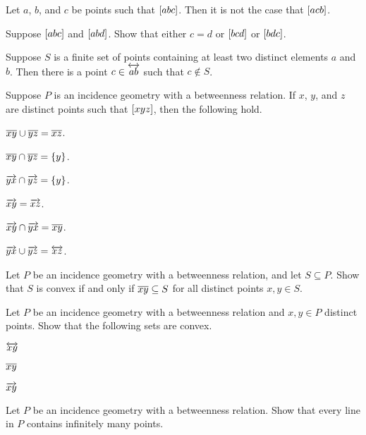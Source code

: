 \Exercises%

\begin{exercise}
Let \(a\), \(b\), and \(c\) be points such that \([ a b c ]\).
Then it is not the case that \([ a c b ]\).
\end{exercise}

\begin{exercise}
Suppose \([ a b c ]\) and \([ a b d ]\).
Show that either \(c = d\) or \([ b c d ]\) or \([ b d c ]\).
\end{exercise}

\begin{exercise}
Suppose \(S\) is a finite set of points containing at least two distinct elements \(a\) and \(b\).
Then there is a point \(c \in \overleftrightarrow{ab}\) such that \(c \notin S\).
\end{exercise}

\begin{exercise}
Suppose \(P\) is an incidence geometry with a betweenness relation.
If \(x\), \(y\), and \(z\) are distinct points such that \([ x y z ]\), then the following hold.
\begin{proplist}
\item \(\overline{xy} \cup \overline{yz} = \overline{xz}\).
\item \(\overline{xy} \cap \overline{yz} = \{y\}\).
\item \(\overrightarrow{yx} \cap \overrightarrow{yz} = \{y\}\).
\item \(\overrightarrow{xy} = \overrightarrow{xz}\).
\item \(\overrightarrow{xy} \cap \overrightarrow{yx} = \overline{xy}\).
\item \(\overrightarrow{yx} \cup \overrightarrow{yz} = \overleftrightarrow{xz}\).
\end{proplist}
\end{exercise}

\begin{exercise}
Let \(P\) be an incidence geometry with a betweenness relation, and let \(S \subseteq P\).
Show that \(S\) is convex if and only if \(\overline{xy} \subseteq S\) for all distinct points \(x,y \in S\).
\end{exercise}

\begin{exercise}
Let \(P\) be an incidence geometry with a betweenness relation and \(x,y \in P\) distinct points.
Show that the following sets are convex.
\begin{proplist}
\item \(\overleftrightarrow{xy}\)
\item \(\overline{xy}\)
\item \(\overrightarrow{xy}\)
\end{proplist}
\end{exercise}

\begin{exercise}
Let \(P\) be an incidence geometry with a betweenness relation.
Show that every line in \(P\) contains infinitely many points.
\end{exercise}
